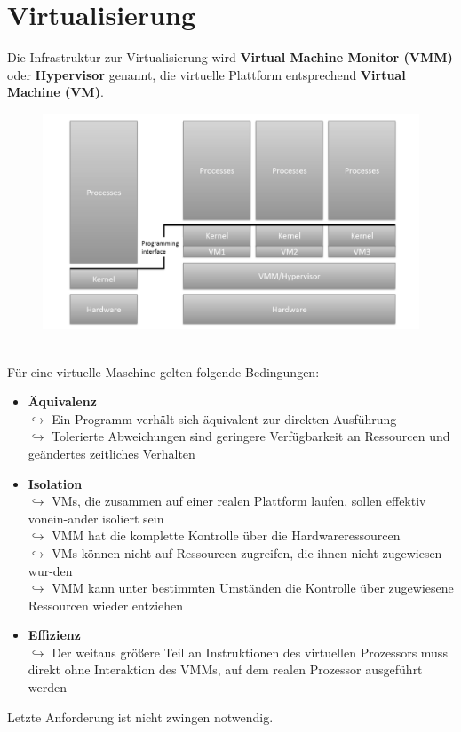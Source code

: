 \documentclass[a4paper,10pt]{scrreprt}
\begin{document}
	\section{Virtualisierung}
	Die Infrastruktur zur Virtualisierung wird \textbf{Virtual Machine Monitor (VMM)} oder \textbf{Hypervisor} genannt, die virtuelle Plattform entsprechend \textbf{Virtual Machine (VM)}.
	\begin{figure}[ht]
		\centering
		\includegraphics[width=1\textwidth]{images/virtualisierung}
	\end{figure}\\
	Für eine virtuelle Maschine gelten folgende Bedingungen:
	\begin{itemize}
		\item \textbf{Äquivalenz}\\[5pt]
		$\hookrightarrow$ Ein Programm verhält sich äquivalent zur direkten Ausführung\\[5pt]
		$\hookrightarrow$ Tolerierte Abweichungen sind geringere Verfügbarkeit an Ressourcen und \hspace*{12pt} geändertes zeitliches Verhalten 
		\item \textbf{Isolation}\\[5pt]
		$\hookrightarrow$ VMs, die zusammen auf einer realen Plattform laufen, sollen effektiv vonein-\hspace*{14pt}ander isoliert sein\\[5pt]
		$\hookrightarrow$ VMM hat die komplette Kontrolle über die Hardwareressourcen\\[5pt]
		$\hookrightarrow$ VMs können nicht auf Ressourcen zugreifen, die ihnen nicht zugewiesen wur-\hspace*{14pt}den\\[5pt]
		$\hookrightarrow$ VMM kann unter bestimmten Umständen die Kontrolle über zugewiesene \hspace*{12pt} Ressourcen wieder entziehen
		\item\textbf{Effizienz}\\[5pt]
		$\hookrightarrow$ Der weitaus größere Teil an Instruktionen des virtuellen Prozessors muss \hspace*{12pt} direkt ohne Interaktion des VMMs, auf dem realen Prozessor ausgeführt \hspace*{13pt} werden
	\end{itemize}
	Letzte Anforderung ist nicht zwingen notwendig.
\end{document}
